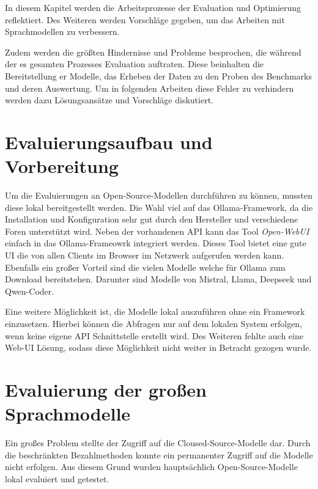 In diesem Kapitel werden die Arbeitsprozesse der Evaluation und Optimierung reflektiert. Des Weiteren werden Vorschläge gegeben, um das Arbeiten mit Sprachmodellen zu verbessern.\vspace{0.2cm}

Zudem werden die größten Hindernisse und Probleme besprochen, die während der es gesamten Prozesses Evaluation auftraten. Diese beinhalten die Bereitstellung er Modelle, das Erheben der Daten zu den Proben des Benchmarks und deren Auswertung. Um in folgenden Arbeiten diese Fehler zu verhindern werden dazu Lösungsansätze und Vorschläge diskutiert.



\section{Evaluierungsaufbau und Vorbereitung}
Um die Evaluierungen an Open-Source-Modellen durchführen zu können, mussten diese lokal bereitgestellt werden. Die Wahl viel auf das Ollama-Framework, da die Installation und Konfiguration sehr gut durch den Hersteller und verschiedene Foren unterstützt wird. Neben der vorhandenen API kann das Tool \textit{Open-WebUI} einfach in das Ollama-Frameowrk integriert werden. Dieses Tool bietet eine gute UI die von allen Clients im Browser im Netzwerk aufgerufen werden kann. Ebenfalls ein großer Vorteil sind die vielen Modelle welche für Ollama zum Download bereitstehen. Darunter sind Modelle von Mistral, Llama, Deepseek und Qwen-Coder.\vspace{0.2cm}

Eine weitere Möglichkeit ist, die Modelle lokal auszuführen ohne ein Framework einzusetzen. Hierbei können die Abfragen nur auf dem lokalen System erfolgen, wenn keine eigene API Schnittstelle erstellt wird. Des Weiteren fehlte auch eine Web-UI Lösung, sodass diese Möglichkeit nicht weiter in Betracht gezogen wurde.\vspace{0.2cm}



\section{Evaluierung der großen Sprachmodelle}
Ein großes Problem stellte der Zugriff auf die Cloused-Source-Modelle dar. Durch die beschränkten Bezahlmethoden konnte ein permanenter Zugriff auf die Modelle nicht erfolgen. Aus diesem Grund wurden hauptsächlich Open-Source-Modelle lokal evaluiert und getestet.



